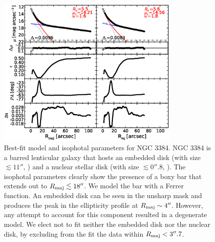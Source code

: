 \documentclass[preprint2]{emulateapj}
\newcommand{\fitfigurewidth}{0.8\textwidth}
\begin{document}
  \begin{figure}[h]
  \begin{center}
  \includegraphics[width=\fitfigurewidth]{images/n3384_1Dfit.eps}
  \caption{Best-fit model and isophotal parameters for NGC 3384.
  NGC 3384 is a barred lenticular galaxy that hosts 
  an embedded disk (with size $\lesssim 11''$, \citealt{erwin2004}) and 
  a nuclear stellar disk (with size $\lesssim 0''.8$, \citealt{ledo2010}).
  The isophotal parameters clearly show the presence of a boxy bar that extends out to $R_{\rm maj} \lesssim 18''$.
  We model the bar with a Ferrer function.
  An embedded disk can be seen in the unsharp mask and produces the peak in the ellipticity profile at $R_{\rm maj} \sim 4''$.
  However, any attempt to account for this component resulted in a degenerate model.
  We elect not to fit neither the embedded disk nor the nuclear disk, by excluding from the fit the data within $R_{\rm maj} < 3''.7$. 
  }
  \end{center}
  \end{figure}
\end{document}
